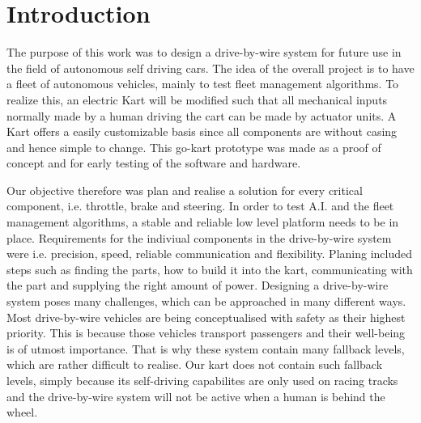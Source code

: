 
\chapter{Introduction}
\label{chp:Introduction}


The purpose of this work was to design a drive-by-wire system for future use in the field of autonomous self driving cars. The idea of the overall project is to have a fleet of autonomous vehicles, mainly to test fleet management algorithms. %
To realize this, an electric Kart will be modified such that all mechanical inputs normally made by a human driving the cart can be made by actuator units. A Kart offers a easily customizable basis since all components are without casing and hence simple to change. This go-kart prototype was made as a proof of concept and for early testing of the software and hardware.

Our objective therefore was plan and realise a solution for every critical component, i.e. throttle, brake and steering. In order to test A.I. and the fleet management algorithms, a stable and reliable low level platform needs to be in place. Requirements for the indiviual components in the drive-by-wire system were i.e. precision, speed, reliable communication and flexibility. Planing included steps such as finding the parts, how to build it into the kart, communicating with the part and supplying the right amount of power.
Designing a drive-by-wire system poses many challenges, which can be approached in many different ways. Most drive-by-wire vehicles are being conceptualised with safety as their highest priority. This is because those vehicles transport passengers and their well-being is of utmost importance. That is why these system contain many fallback levels, which are rather difficult to realise. Our kart does not contain such fallback levels, simply because its self-driving capabilites are only used on racing tracks and the drive-by-wire system will not be active when a human is behind the wheel. 


